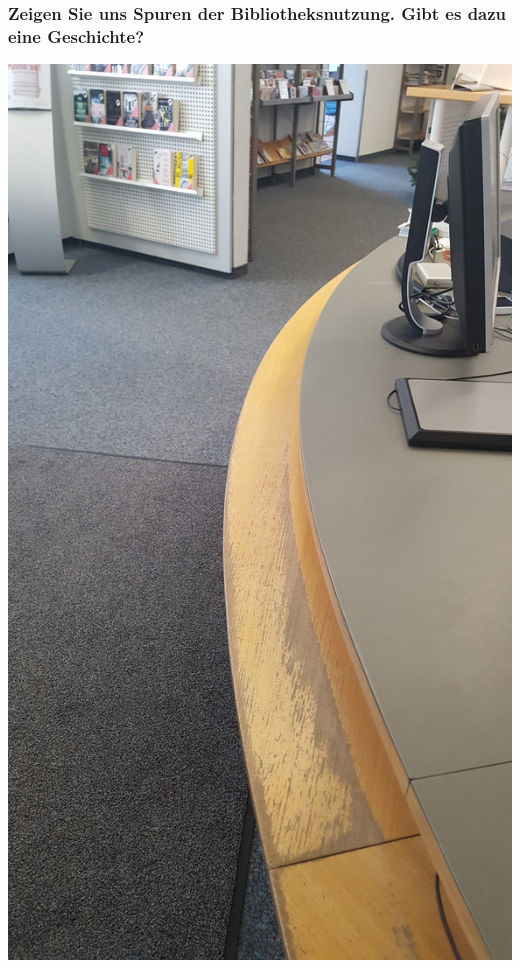 \hypertarget{zeigen-sie-uns-spuren-der-bibliotheksnutzung.-gibt-es-dazu-eine-geschichte}{%
\subsubsection*{Zeigen Sie uns Spuren der Bibliotheksnutzung. Gibt es dazu eine
Geschichte?}\label{zeigen-sie-uns-spuren-der-bibliotheksnutzung.-gibt-es-dazu-eine-geschichte}}

\begin{center}
\includegraphics{kisch/img/ausleihtheke.jpg}
\end{center}

